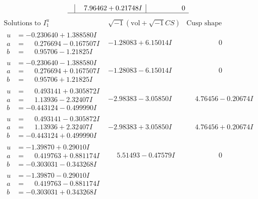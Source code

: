 \documentclass[1p]{elsarticle_modified}
\theoremstyle{definition}
\newcommand{\I}{\sqrt{-1}}
\begin{document}
$$\begin{array}{c|c|c}
 & \phantom{-}7.96462 + 0.21748 I & \phantom{-0.000000 } 0\\
 \hline 
 \end{array}$$\newpage$$\begin{array}{c|c|c}  
\text{Solutions to }I^u_{1}& \I (\text{vol} + \sqrt{-1}CS) & \text{Cusp shape}\\
 \hline 
\begin{aligned}
u &= -0.230640 + 1.388580 I \\
a &= \phantom{-}0.276694 - 0.167507 I \\
b &= \phantom{-}0.95706 - 1.21825 I\end{aligned}
 & -1.28083 + 6.15014 I & \phantom{-0.000000 } 0 \\ \hline\begin{aligned}
u &= -0.230640 - 1.388580 I \\
a &= \phantom{-}0.276694 + 0.167507 I \\
b &= \phantom{-}0.95706 + 1.21825 I\end{aligned}
 & -1.28083 - 6.15014 I & \phantom{-0.000000 } 0 \\ \hline\begin{aligned}
u &= \phantom{-}0.493141 + 0.305872 I \\
a &= \phantom{-}1.13936 - 2.32407 I \\
b &= -0.443124 - 0.499990 I\end{aligned}
 & -2.98383 - 3.05850 I & \phantom{-}4.76456 - 0.20674 I \\ \hline\begin{aligned}
u &= \phantom{-}0.493141 - 0.305872 I \\
a &= \phantom{-}1.13936 + 2.32407 I \\
b &= -0.443124 + 0.499990 I\end{aligned}
 & -2.98383 + 3.05850 I & \phantom{-}4.76456 + 0.20674 I \\ \hline\begin{aligned}
u &= -1.39870 + 0.29010 I \\
a &= \phantom{-}0.419763 + 0.881174 I \\
b &= -0.303031 - 0.343268 I\end{aligned}
 & \phantom{-}5.51493 - 0.47579 I & \phantom{-0.000000 } 0 \\ \hline\begin{aligned}
u &= -1.39870 - 0.29010 I \\
a &= \phantom{-}0.419763 - 0.881174 I \\
b &= -0.303031 + 0.343268 I\end{aligned}

\end{array}$$
\end{document}
